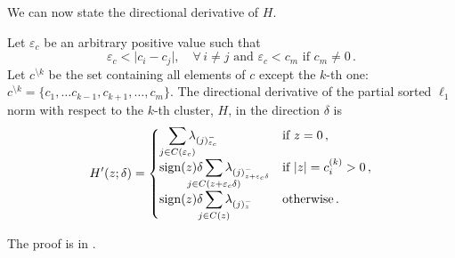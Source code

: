 
We can now state the directional derivative of $H$. %

\begin{theorem}\label{thm:sl1-directional-derivative}
  Let $\varepsilon_c$ be an arbitrary positive value such that
  \begin{equation}
    \label{eq:epsilon-c}
    \varepsilon_c < \big| c_i - c_j\big| , \quad \forall\, i \neq j \text{ and } \varepsilon_c < c_m \text{ if } c_m \neq 0 \, .
  \end{equation}
  Let \(c^{\setminus k}\) be the set containing all elements of $c$ except the $k$-th one: $c^{\setminus k} =  \{c_1, \ldots c_{k-1}, c_{k+1}, \ldots, c_m \}$.
  The directional derivative of the partial sorted $\ell_1$ norm with respect to the $k$-th cluster, \(H\), in the direction \(\delta\) is
  \[
    H'(z; \delta) =
    \begin{cases}
      \smashoperator[r]{\sum_{j \in C(\varepsilon_c )}} \lambda_{(j)^-_{\varepsilon_c }}
       & \text{if } z = 0 \, ,               \\
      \sign(z)\delta\smashoperator{\sum_{j \in C(z + {\varepsilon_c} \delta)}} \lambda_{(j)^-_{z + {\varepsilon_c}\delta}}
       & \text{if } |z| = c^{(k)}_i > 0 \, , \\
      \sign(z)\delta\smashoperator{\sum_{j \in C(z)}} \lambda_{(j)^-_{z}}
       & \text{otherwise} \, .
    \end{cases}
  \]
\end{theorem}
The proof is in .

